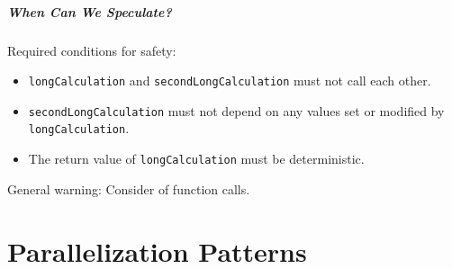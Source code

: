 \documentclass[aspectratio=43]{beamer}
\newenvironment{changemargin}[1]{%
  \begin{list}{}{%
    \setlength{\topsep}{0pt}%
    \setlength{\leftmargin}{#1}%
    \setlength{\rightmargin}{1em}
    \setlength{\listparindent}{\parindent}%
    \setlength{\itemindent}{\parindent}%
    \setlength{\parsep}{\parskip}%
  }%
  \item[]}{\end{list}}
\begin{document}
\begin{frame}
  \frametitle{When Can We Speculate?}

  \begin{changemargin}{2.5cm}
  Required conditions for safety:

  \begin{itemize}
    \item {\tt longCalculation} and {\tt secondLongCalculation} must not call
      each other.
    \item {\tt secondLongCalculation} must not depend on
      any values set or modified by {\tt longCalculation}.
    \item The return value of {\tt longCalculation} must be deterministic.
  \end{itemize}

  General warning: Consider  of function calls.
  \end{changemargin}
\end{frame}

  \part{Parallelization Patterns}
\frame{\partpage}
\end{document}
